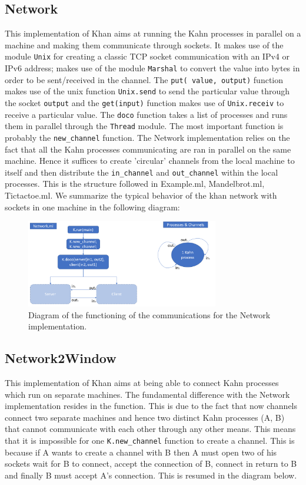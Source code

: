 \documentclass[10pt,a4paper]{article}
\begin{document}
\subsection{Network}
This implementation of Khan aims at running the Kahn processes in parallel on a machine and making them communicate through sockets. It makes use of the module \texttt{Unix} for creating a classic TCP socket communication with an IPv4 or IPv6 address; makes use of the module \texttt{Marshal} to convert the value into bytes in order to be sent/received in the channel. The \texttt{put( value, output)} function makes use of the unix function \texttt{Unix.send} to send the particular value through the socket \texttt{output} and the \texttt{get(input)} function makes use of \texttt{Unix.receiv} to receive a particular value. The \texttt{doco} function takes a list of processes and runs them in parallel through the \texttt{Thread} module. The most important function is probably the \texttt{new\_channel} function. The Network implementation relies on the fact that all the Kahn processes communicating are ran in parallel on the same machine. Hence it suffices to create 'circular' channels from the local machine to itself and then distribute the \texttt{in\_channel} and \texttt{out\_channel} within the local processes. This is the structure followed in Example.ml, Mandelbrot.ml, Tictactoe.ml.   We summarize the typical behavior of the khan network with sockets in one machine in the following diagram:
\begin{figure}[h!]
   \centering
   \includegraphics[width = 0.75\textwidth]{diagram1.png}
   \caption{Diagram of the functioning of the communications for the Network implementation.}
   \label{fig:my_label}
\end{figure}

\subsection{Network2Window}
This implementation of Khan aims at being able to connect Kahn processes which run on separate machines. The fundamental difference with the Network implementation resides in the  function. This is due to the fact that now channels connect two separate machines and hence two distinct Kahn processes (A, B) that cannot communicate with each other through any other means. This means that it is impossible for one \texttt{K.new\_channel} function to create a channel. This is because if A wants to create a channel with B then A must open two of his sockets wait for B to connect, accept the connection of B, connect in return to B and finally B must accept A's connection. This is resumed in the diagram below.
\end{document}
